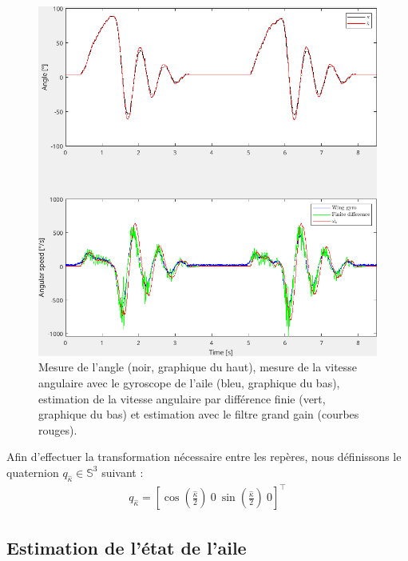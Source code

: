\begin{figure}[ht!]
\centering
    \includegraphics[width=0.6\columnwidth,angle=0]{figures/highGainFilter.png}
    \caption{Mesure de l'angle (noir, graphique du haut), mesure de la vitesse angulaire avec le gyroscope de l'aile (bleu, graphique du bas), estimation de la vitesse angulaire par différence finie (vert, graphique du bas) et estimation avec le filtre grand gain (courbes rouges).}
    \label{fig:high_gain}
\end{figure}

Afin d'effectuer la transformation nécessaire entre les repères, nous définissons le quaternion $q_{\hat{\kappa}} \in {\mathbb S}^3$ suivant :
\begin{align}
\label{eq:rot_quat}
    q_{\hat{\kappa}} =  \left[\cos\left(\frac{\hat{\kappa}}{2}\right) ~ 0 ~ \sin\left(\frac{\hat{\kappa}}{2}\right) ~ 0 \right]^\top
\end{align}


\subsection{Estimation de l'état de l'aile}

